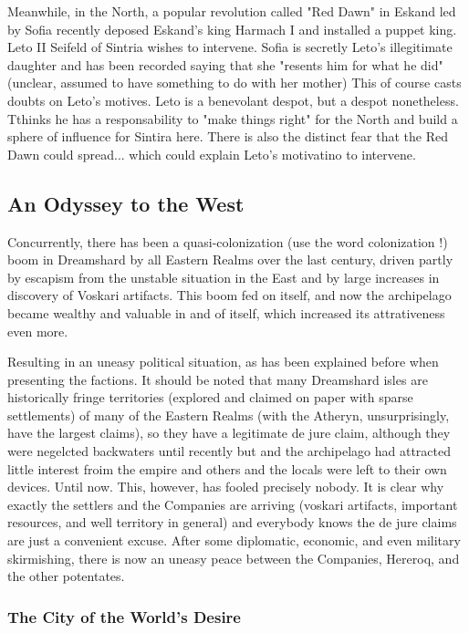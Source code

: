 Meanwhile, in the North, a popular revolution called "Red Dawn" in Eskand led by Sofia recently deposed Eskand's king Harmach I and installed a puppet king. Leto II Seifeld of Sintria wishes to intervene. Sofia is secretly Leto's illegitimate daughter and has been recorded saying that she "resents him for what he did" (unclear, assumed to have something to do with her mother) This of course casts doubts on Leto's motives. Leto is a benevolant despot, but a despot nonetheless. Tthinks he has a responsability to "make things right" for the North and build a sphere of influence for Sintira here. There is also the distinct fear that the Red Dawn could spread... which could explain Leto's motivatino to intervene.

\subsection{An Odyssey to the West}
 
Concurrently, there has been a quasi-colonization (use the word colonization !) boom in Dreamshard by all Eastern Realms over the last century, driven partly by escapism from the unstable situation in the East and by large increases in discovery of Voskari artifacts. This boom fed on itself, and now the archipelago became wealthy and valuable in and of itself, which increased its attrativeness even more.

Resulting in an uneasy political situation, as has been explained before when presenting the factions. It should be noted that many Dreamshard isles are historically fringe territories (explored and claimed on paper with sparse settlements) of many of the Eastern Realms (with the Atheryn, unsurprisingly, have the largest claims), so they have a legitimate de jure claim, although they were negelcted backwaters until recently but and the archipelago had attracted little interest froim the empire and others and the locals were left to their own devices. Until now. This, however, has fooled precisely nobody. It is clear why exactly the settlers and the Companies are arriving (voskari artifacts, important resources, and well territory in general) and everybody knows the de jure claims are just a convenient excuse. After some diplomatic, economic, and even military skirmishing, there is now an uneasy peace between the Companies, Hereroq, and the other potentates.

\subsubsection{The City of the World's Desire}

